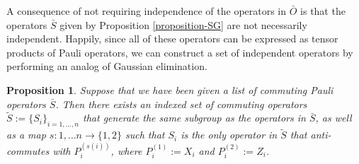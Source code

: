\documentclass[twocolumn,showpacs,preprintnumbers,amsmath,amssymb,nofootinbib,pra,floatfix]{revtex4}
\newtheorem{proposition}{Proposition}
\newenvironment{remark}[1][Remark]{\begin{trivlist}
\item[\hskip \labelsep {\bfseries #1}]}{\end{trivlist}}
\newcommand{\lst}{\bar}
\newcommand{\set}{\tilde}
\begin{document}
\begin{remark}
A consequence of not requiring independence of the operators in $\lst O$ is that the operators $\lst S$ given by Proposition \ref{proposition-SG} are not necessarily independent.  Happily, since all of these operators can be expressed as tensor products of Pauli operators, we can construct a set of independent operators by performing an analog of Gaussian elimination.
\end{remark}

\begin{proposition}
\label{make-independent-using-elimination}
Suppose that we have been given a list of commuting Pauli operators $\lst S$.  Then there exists an indexed set of commuting operators $\set S := \{S_i\}_{i=1,\dots,n}$ that generate the same subgroup as the operators in $\lst S$, as well as a map $s:1,\dots n \to \{1,2\}$ such that $S_i$ is the only operator in $\set S$ that anti-commutes with $P_i^{(s(i))}$, where $P_i^{(1)}:=X_i$ and $P_i^{(2)}:=Z_i$.
\end{proposition}
\end{document}
